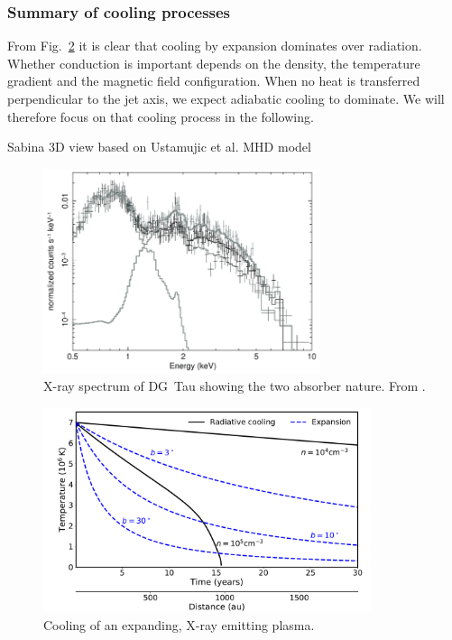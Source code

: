 \subsubsection{Summary of cooling processes}
From Fig.~\ref{fig:cooling} it is clear that cooling by expansion dominates over radiation. Whether conduction is important depends on the density, the temperature gradient and the magnetic field configuration. When no heat is transferred perpendicular to the jet axis, we expect adiabatic cooling to dominate. We will therefore focus on that cooling process in the following.



{\color{blue}Sabina
3D view based on Ustamujic et al. MHD model}



\begin{figure}[t]
\centering

\includegraphics[height=6cm]{figs/tax}
\caption{X-ray spectrum of DG~Tau showing the two absorber nature. From \citet{}. \label{fig:tax}}
\end{figure}



\begin{figure}[t]
\centering

\includegraphics[height=6cm]{figs/cooling}
\caption{Cooling of an expanding, X-ray emitting plasma. \label{fig:cooling}}
\end{figure}


